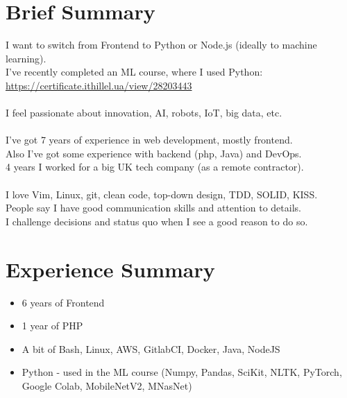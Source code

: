 \documentclass[a4paper, 14pt]{article}
\begin{document}
\begin{center}
	\textsc{\Huge{}}
\end{center}


\section{Brief Summary}
  I want to switch from Frontend to Python or Node.js (ideally to machine learning). \\
  I've recently completed an ML course, where I used Python: \\
  \url{https://certificate.ithillel.ua/view/28203443} \\
  \\
  I feel passionate about innovation, AI, robots, IoT, big data, etc. \\
  \\
  I've got 7 years of experience in web development, mostly frontend.  \\
  Also I've got some experience with backend (php, Java) and DevOps.  \\
  4 years I worked for a big UK tech company (as a remote contractor). \\
  \\
  I love Vim, Linux, git, clean code, top-down design, TDD, SOLID, KISS. \\
  People say I have good communication skills and attention to details. \\
  I challenge decisions and status quo when I see a good reason to do so.

\section{Experience Summary}
  \begin{itemize}
    \item 6 years of Frontend  \\
    \item 1 year of PHP \\
    \item A bit of Bash, Linux, AWS, GitlabCI, Docker, Java, NodeJS \\
    \item Python - used in the ML course (Numpy, Pandas, SciKit, NLTK, PyTorch, Google Colab, MobileNetV2, MNasNet) 
  \end{itemize}
\end{document}
